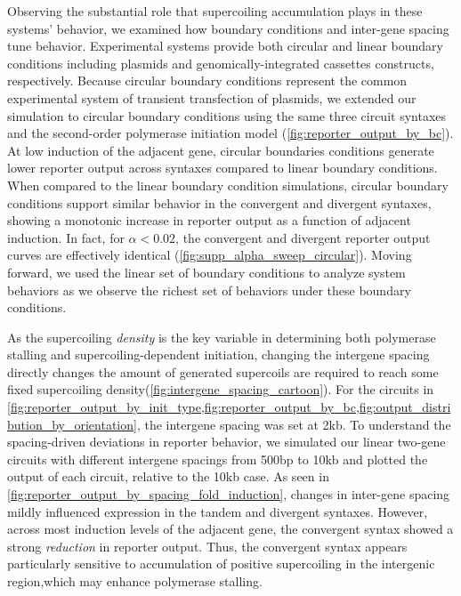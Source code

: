 \documentclass[11pt]{article}
\begin{document}
Observing the substantial role that supercoiling accumulation plays in these systems' behavior, we examined how boundary conditions and inter-gene spacing tune behavior. Experimental systems provide both  circular and linear boundary conditions including  plasmids and genomically-integrated cassettes constructs, respectively. Because circular boundary conditions represent the common experimental system of transient transfection of plasmids, we extended our simulation to circular boundary conditions using the same three circuit syntaxes and the second-order polymerase initiation model (\cref{fig:reporter_output_by_bc}). At low induction of the adjacent gene, circular boundaries conditions generate lower reporter output across syntaxes compared to linear boundary conditions. When compared to the linear boundary condition simulations,  circular boundary conditions support similar behavior in the convergent and divergent syntaxes, showing a monotonic increase in reporter output as a function of adjacent induction. In fact, for \(\alpha < 0.02\), the convergent and divergent reporter output curves are effectively identical (\cref{fig:supp_alpha_sweep_circular}).
Moving forward, we used the linear set of boundary conditions to analyze system behaviors as we observe the richest set of behaviors under these boundary conditions.

As the supercoiling \emph{density} is the key variable in determining both polymerase stalling and supercoiling-dependent initiation, changing the intergene spacing directly changes the amount of generated supercoils are required to reach some fixed supercoiling density(\cref{fig:intergene_spacing_cartoon}). For the circuits in \cref{fig:reporter_output_by_init_type,fig:reporter_output_by_bc,fig:output_distribution_by_orientation}, the intergene spacing was set at 2kb. To understand the spacing-driven deviations in reporter behavior, we simulated our linear two-gene circuits with different intergene spacings from 500bp to 10kb and plotted the output of each circuit, relative to the 10kb case. As seen in \cref{fig:reporter_output_by_spacing_fold_induction}, changes in inter-gene spacing mildly influenced expression in the tandem and divergent syntaxes. However, across most induction levels of the adjacent gene, the convergent syntax showed a strong \emph{reduction} in reporter output. Thus, the convergent syntax appears particularly sensitive to accumulation of positive supercoiling in the intergenic region,which may enhance polymerase stalling.
\end{document}
